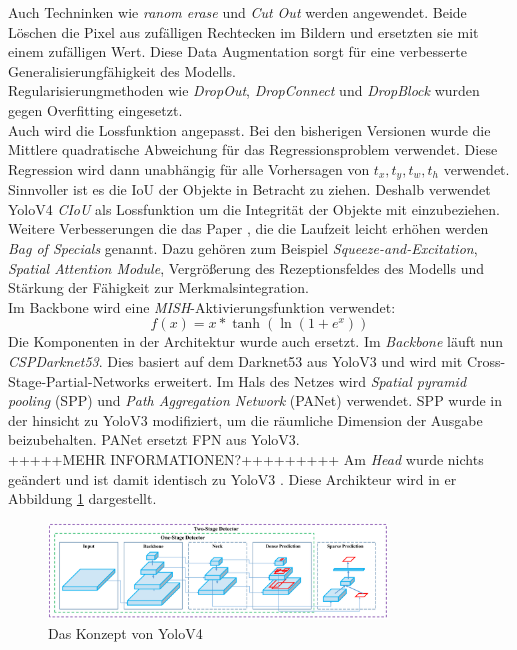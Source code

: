 \documentclass[conference]{IEEEtran}
\begin{document}
	Auch Techninken wie \textit{ranom erase} und \textit{Cut Out} werden angewendet. Beide Löschen die Pixel aus zufälligen Rechtecken im Bildern und ersetzten sie mit einem zufälligen Wert.	Diese Data Augmentation sorgt für eine verbesserte Generalisierungfähigkeit des Modells.\\
	Regularisierungmethoden wie \textit{DropOut}, \textit{DropConnect} und \textit{DropBlock} wurden gegen Overfitting eingesetzt.\\
	Auch wird die Lossfunktion angepasst. Bei den bisherigen Versionen wurde die Mittlere quadratische Abweichung für das Regressionsproblem verwendet. Diese Regression wird dann unabhängig für alle Vorhersagen von $t_x, t_y, t_w, t_h$ verwendet. Sinnvoller ist es die IoU der Objekte in Betracht zu ziehen. Deshalb verwendet YoloV4 \textit{CIoU} als Lossfunktion um die Integrität der Objekte mit einzubeziehen. 
	Weitere Verbesserungen die das Paper \cite{b2}, die die Laufzeit leicht erhöhen werden \textit{Bag of Specials} genannt. Dazu gehören zum Beispiel \textit{Squeeze-and-Excitation}, \textit{Spatial Attention Module}, Vergrößerung des Rezeptionsfeldes des Modells und Stärkung der Fähigkeit zur Merkmalsintegration. \\
	Im Backbone wird eine \textit{MISH}-Aktivierungsfunktion verwendet:
	\[ f(x) = x* \tanh (\ln (1+e^x)) \]
	Die Komponenten in der Architektur wurde auch ersetzt. Im \textit{Backbone} läuft nun \textit{CSPDarknet53}. Dies basiert auf dem Darknet53 aus YoloV3 und wird mit Cross-Stage-Partial-Networks erweitert. Im Hals des Netzes wird \textit{Spatial pyramid pooling} (SPP) und \textit{Path Aggregation Network} (PANet) verwendet. SPP wurde in der hinsicht zu YoloV3 modifiziert, um die räumliche Dimension der Ausgabe beizubehalten. PANet ersetzt FPN aus YoloV3.\\
	+++++MEHR INFORMATIONEN?+++++++++
	Am \textit{Head} wurde nichts geändert und  ist damit identisch zu YoloV3 \cite{b2}. Diese Archikteur wird in er Abbildung \ref{V4Arch} dargestellt.
	\begin{figure}[!h]
		\begin{center}
			\includegraphics[width=9cm]{Media/YoloV4Arch.png}
			\caption{Das Konzept von YoloV4 \cite{b2}}
			\label{V4Arch}
		\end{center}
	\end{figure}
\end{document}
